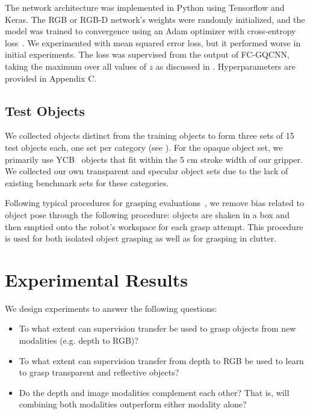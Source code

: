 The network architecture was implemented in Python using Tensorflow and Keras. 
The RGB or RGB-D network's weights were randomly initialized, and the model was trained to convergence using an Adam optimizer with cross-entropy loss~\cite{kahn2018self, kalashnikov2018qt}. 
We experimented with mean squared error loss, but it performed worse in initial experiments. 
The loss was supervised from the output of FC-GQCNN, taking the maximum over all values of $z$ as discussed in . Hyperparameters are provided in Appendix C.

\subsection{Test Objects}

We collected objects distinct from the training objects to form three sets of 15 test objects each, one set per category (see ).
For the opaque object set, we primarily use YCB~\cite{calli2015benchmarking} objects that fit within the 5 cm stroke width of our gripper. 
We collected our own transparent and specular object sets due to the lack of existing benchmark sets for these categories. 

Following typical procedures for grasping evaluations~\cite{mahler2017dex, viereck2017learning}, we remove bias related to object pose through the following procedure: objects are shaken in a box and then emptied onto the robot's workspace for each grasp attempt. This procedure is used for both isolated object grasping as well as for grasping in clutter.

\section{Experimental Results}
\label{sec:results}

We design experiments to answer the following questions:
\begin{itemize}
    \item To what extent can supervision transfer be used to grasp objects from new modalities (e.g. depth to RGB)?
    \item To what extent can supervision transfer from depth to RGB be used to learn to grasp transparent and reflective objects?
    \item Do the depth and image modalities complement each other? That is, will combining both modalities outperform either modality alone?
\end{itemize}

